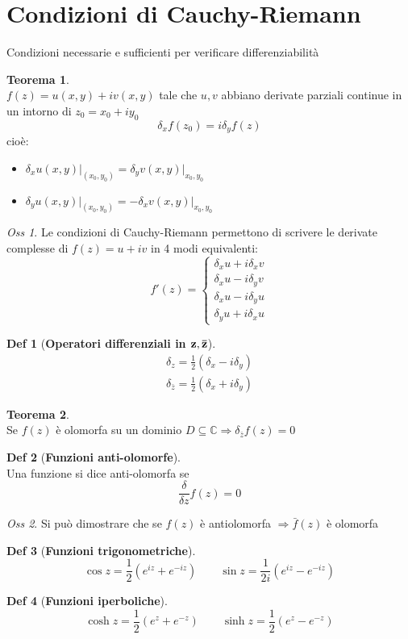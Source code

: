 \documentclass[a4paper,11pt]{report}
\theoremstyle{remark}
\newtheorem*{oss}{Oss}
\theoremstyle{definition}
\newtheorem*{teo}{Teorema}
\newtheorem*{Def}{Def}
\newcommand{\C}{\mathbb{C}}
\begin{document}
\section{Condizioni di Cauchy-Riemann}
Condizioni necessarie e sufficienti per verificare differenziabilità
\begin{teo}\hfill\\
	$f(z) = u(x,y) + iv(x,y)$ tale che $u,v$ abbiano derivate parziali continue in un intorno di $z_0 = x_0 + iy_0$
	 \[\delta_x f(z_0) = i\delta_y f(z)\] cioè:
		\begin{itemize}
			\item $\delta_x u(x,y) \bigr|_{(x_0,y_0)} = \delta_y v(x,y) \bigr|_{x_0,y_0}$
			\item $\delta_y u(x,y) \bigr|_{(x_0,y_0)} = -\delta_x v(x,y) \bigr|_{x_0,y_0}$
		\end{itemize}
\end{teo}
\begin{oss}
	Le condizioni di Cauchy-Riemann permettono di scrivere le derivate complesse di $f(z) = u +iv$ in 4 modi equivalenti:
	\[f'(z) = \begin{cases}
		\delta_x u + i \delta_x v \\
		\delta_x u - i \delta_y v \\
		\delta_x u - i \delta_y u \\
		\delta_y u + i \delta_x u 
	\end{cases}\]
\end{oss}
\begin{Def}[\textbf{Operatori differenziali in $\bf {z,\bar{z}}$}]
	\begin{gather*}
		\delta_z = \frac{1}{2}(\delta_x - i\delta_y) \\
		\delta_{\bar{z}} = \frac{1}{2}(\delta_x + i\delta_y)
	\end{gather*}
\end{Def}
\begin{teo}\hfil\\
	Se $f(z)$ è olomorfa su un dominio $D \subseteq \C \Rightarrow \delta_{\bar{z}} f(z) =0$
\end{teo}
\begin{Def}[\textbf{Funzioni anti-olomorfe}]\hfil\\
	Una funzione si dice anti-olomorfa se
	\[\frac{\delta}{\delta z} f(z) =0\]
\end{Def}
\begin{oss}
	Si può dimostrare che se $f(z)$ è antiolomorfa $\Rightarrow \bar{f}(z)$ è olomorfa 
\end{oss}
\begin{Def}[\textbf{Funzioni trigonometriche}]
	\[\cos{z} = \frac{1}{2} (e^{iz} + e^{-iz}) \qquad \sin{z} = \frac{1}{2i} (e^{iz} - e^{-iz}) \]
\end{Def}
\begin{Def}[\textbf{Funzioni iperboliche}]
	\[\cosh{z} = \frac{1}{2} (e^z+e^{-z}) \qquad \sinh{z} = \frac{1}{2} (e^z-e^{-z})\]
\end{Def}
\end{document}
